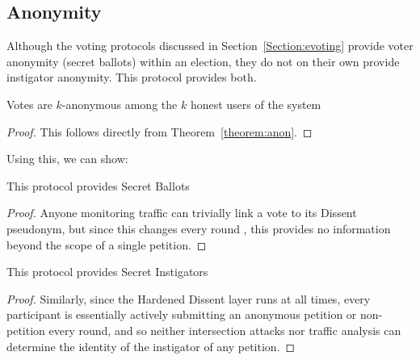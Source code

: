 \subsection{Anonymity}
Although the voting protocols discussed in Section~\ref{Section:evoting}
provide voter anonymity (secret ballots) within an election, they do not on
their own provide instigator anonymity. This protocol provides both.

\begin{lemma} Votes are $k$-anonymous among the $k$ honest users of the system
\end{lemma}
\begin{proof} This follows directly from Theorem~\ref{theorem:anon}.\end{proof}

Using this, we can show:

\begin{theorem} This protocol provides Secret Ballots \end{theorem}
\begin{proof} Anyone monitoring traffic can trivially link a vote to its Dissent
  pseudonym, but since this changes every round \cite{sec}, this provides no
  information beyond the scope of a single petition.
\end{proof}

\begin{theorem} This protocol provides Secret Instigators \end{theorem}
\begin{proof} Similarly, since the Hardened Dissent layer runs at all times,
  every participant is essentially actively submitting an anonymous petition or
  non-petition every round, and so neither intersection attacks nor traffic
  analysis can determine the identity of the instigator of any petition.
\end{proof}

